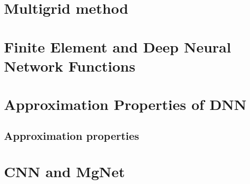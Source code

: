 
\chapter{Multigrid method}



%




\chapter{Finite Element and Deep Neural Network Functions}




\chapter{Approximation Properties of DNN}


\newpage

%
\newpage
\section{Approximation properties}


%
\newpage


%
\newpage
\chapter{CNN and MgNet}



